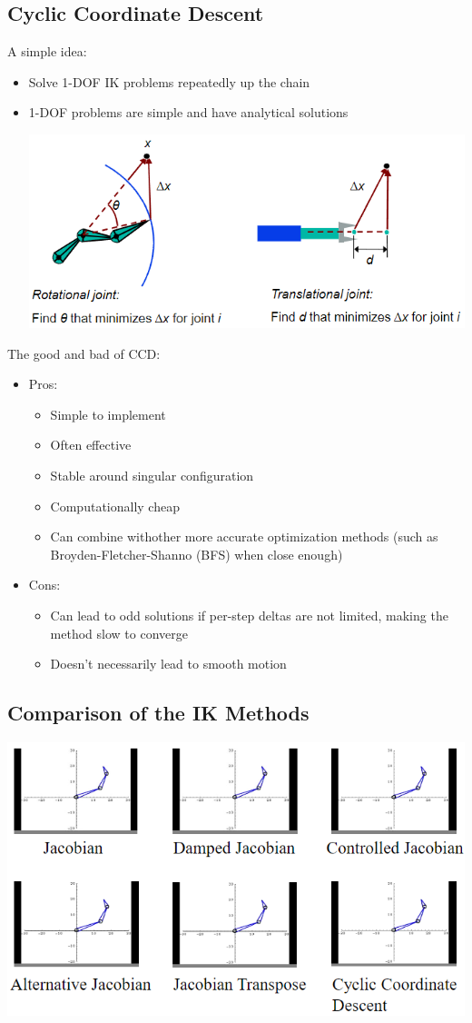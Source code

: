 \documentclass{article}
\begin{document}
\subsection*{Cyclic Coordinate Descent}
A simple idea:
\begin{itemize}
    \item Solve 1-DOF IK problems repeatedly up the chain
    \item 1-DOF problems are simple and have analytical solutions
    \begin{center}
        \includegraphics*[scale=0.8]{W7_19.png}
    \end{center}
\end{itemize}
The good and bad of CCD:
\begin{itemize}
    \item Pros:
    \begin{itemize}
        \item Simple to implement
        \item Often effective
        \item Stable around singular configuration
        \item Computationally cheap
        \item Can combine withother more accurate optimization methods (such as Broyden-Fletcher-Shanno (BFS) when close enough)
    \end{itemize}
    \item Cons:
    \begin{itemize}
        \item Can lead to odd solutions if per-step deltas are not limited, making the method slow to converge
        \item Doesn't necessarily lead to smooth motion
    \end{itemize}
\end{itemize}

\subsection*{Comparison of the IK Methods}
\begin{center}
    \includegraphics*[scale=0.9]{W7_20.png}
\end{center}
\end{document}
